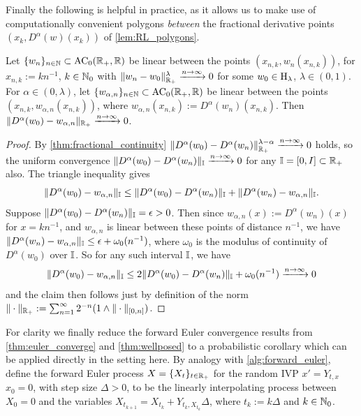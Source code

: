 Finally the following is helpful in practice, as it allows us to make use of computationally convenient polygons \emph{between} the fractional derivative points $(x_k,D^\alpha(w)(x_k))$ of \autoref{lem:RL_polygons}.

\begin{lemma}\label{eq:polygon_converge}
    Let $\{w_n\}_{n\in\mathbb{N}}\subset\mathrm{AC}_0(\mathbb{R}_+,\mathbb{R})$ be linear between the points $(x_{n,k},w_n(x_{n,k}))$, for $x_{n,k}:=kn^{-1}$, $k\in\mathbb{N}_0$ with $\Vert w_n-w_0\Vert^\lambda_{\mathbb{R}_+}\xrightarrow{n\to\infty}0$ for some $w_0\in\mathrm{H}_\lambda$, $\lambda\in(0,1)$. For $\alpha\in(0,\lambda)$, let $\{w_{\alpha,n}\}_{n\in\mathbb{N}}\subset\mathrm{AC}_0(\mathbb{R}_+,\mathbb{R})$ be linear between the points $(x_{n,k},w_{\alpha,n}(x_{n,k}))$, where $w_{\alpha,n}(x_{n,k}):=D^\alpha(w_n)(x_{n,k})$. Then $\Vert D^\alpha(w_0)- w_{\alpha,n}\Vert_{\mathbb{R}_+}\xrightarrow{n\to\infty}0$.
\end{lemma}
\begin{proof}
    By \autoref{thm:fractional_continuity} $\Vert D^\alpha(w_0)- D^\alpha(w_n)\Vert^{\lambda-\alpha}_{\mathbb{R}_+}\xrightarrow{n\to\infty}0$ holds, so the uniform convergence $\Vert D^\alpha(w_0)- D^\alpha(w_n)\Vert_{\mathbb{I}}\xrightarrow{n\to\infty}0$ for any $\mathbb{I}=[0,I]\subset\mathbb{R}_+$ also. The triangle inequality gives
    \begin{equation}
        \Vert D^\alpha(w_0)- w_{\alpha,n}\Vert_{\mathbb{I}}\le\Vert D^\alpha(w_0)- D^\alpha(w_n)\Vert_{\mathbb{I}} + \Vert D^\alpha(w_n)- w_{\alpha,n}\Vert_{\mathbb{I}}.
    \end{equation}
    Suppose $\Vert D^\alpha(w_0)- D^\alpha(w_n)\Vert_{\mathbb{I}}=\epsilon>0$. Then since $w_{\alpha,n}(x):=D^\alpha(w_n)(x)$ for $x=kn^{-1}$, and $w_{\alpha,n}$ is linear between these points of distance $n^{-1}$, we have $\Vert D^\alpha(w_n)- w_{\alpha,n}\Vert_{\mathbb{I}}\le\epsilon+\omega_0(n^{-1})$, where $\omega_0$ is the modulus of continuity of $D^\alpha(w_0)$ over $\mathbb{I}$. So for any such interval $\mathbb{I}$, we have
    \begin{equation}
        \Vert D^\alpha(w_0)- w_{\alpha,n}\Vert_{\mathbb{I}}\le 2\Vert D^\alpha(w_0)- D^\alpha(w_n)\Vert_{\mathbb{I}} + \omega_0(n^{-1}) \xrightarrow{n\to\infty}0
    \end{equation}
    and the claim then follows just by definition of the norm $\Vert\cdot\Vert_{\mathbb{R}_+}:=\sum_{n=1}^\infty2^{-n}(1\wedge\Vert\cdot\Vert_{[0,n]})$.
\end{proof}

For clarity we finally reduce the forward Euler convergence results from \autoref{thm:euler_converge} and \autoref{thm:wellposed} to a probabilistic corollary which can be applied directly in the setting here. By analogy with \autoref{alg:forward_euler}, define the forward Euler process $X=\{X_t\}_{t\in\mathbb{R}_+}$ for the random IVP $x'=Y_{t,x}$ $x_0=0$, with step size $\Delta>0$, to be the linearly interpolating process between $X_0=0$ and the variables $X_{t_{k+1}} = X_{t_k} + Y_{t_k,X_{t_k}}\Delta$, where $t_k:=k\Delta$ and $k\in\mathbb{N}_0$.

